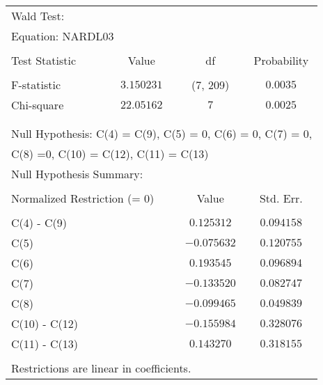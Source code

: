 \begin{tabular}{lrrr}
\multicolumn{1}{l}{Wald Test:}&\multicolumn{1}{c}{}&\multicolumn{1}{c}{}&\multicolumn{1}{c}{}\\
\multicolumn{2}{l}{Equation: NARDL03}&\multicolumn{1}{c}{}&\multicolumn{1}{c}{}\\
[4.5pt] \hline \\ [-4.5pt]
\multicolumn{1}{l}{Test Statistic}&\multicolumn{1}{c}{Value}&\multicolumn{1}{c}{df}&\multicolumn{1}{c}{Probability}\\
[4.5pt] \hline \\ [-4.5pt]
\multicolumn{1}{l}{F-statistic}&\multicolumn{1}{c}{$3.150231$}&\multicolumn{1}{c}{(7, 209)}&\multicolumn{1}{c}{$0.0035$}\\
\multicolumn{1}{l}{Chi-square}&\multicolumn{1}{c}{$22.05162$}&\multicolumn{1}{c}{$7$}&\multicolumn{1}{c}{$0.0025$}\\
[4.5pt] \hline \\ [-4.5pt]
\multicolumn{1}{c}{}&\multicolumn{1}{c}{}&\multicolumn{1}{c}{}&\multicolumn{1}{c}{}\\
\multicolumn{5}{l}{Null Hypothesis: C(4) = C(9), C(5) = 0, C(6) = 0, C(7) = 0,}\\
\multicolumn{3}{l}{C(8) =0, C(10) = C(12), C(11) = C(13)}&\multicolumn{1}{c}{}\\
\multicolumn{2}{l}{Null Hypothesis Summary:}&\multicolumn{1}{c}{}&\multicolumn{1}{c}{}\\
[4.5pt] \hline \\ [-4.5pt]
\multicolumn{2}{l}{Normalized Restriction (= 0)}&\multicolumn{1}{c}{Value}&\multicolumn{1}{c}{Std. Err.}\\
[4.5pt] \hline \\ [-4.5pt]
\multicolumn{1}{l}{C(4) - C(9)}&\multicolumn{1}{c}{}&\multicolumn{1}{c}{$0.125312$}&\multicolumn{1}{c}{$0.094158$}\\
\multicolumn{1}{l}{C(5)}&\multicolumn{1}{c}{}&\multicolumn{1}{c}{$-0.075632$}&\multicolumn{1}{c}{$0.120755$}\\
\multicolumn{1}{l}{C(6)}&\multicolumn{1}{c}{}&\multicolumn{1}{c}{$0.193545$}&\multicolumn{1}{c}{$0.096894$}\\
\multicolumn{1}{l}{C(7)}&\multicolumn{1}{c}{}&\multicolumn{1}{c}{$-0.133520$}&\multicolumn{1}{c}{$0.082747$}\\
\multicolumn{1}{l}{C(8)}&\multicolumn{1}{c}{}&\multicolumn{1}{c}{$-0.099465$}&\multicolumn{1}{c}{$0.049839$}\\
\multicolumn{1}{l}{C(10) - C(12)}&\multicolumn{1}{c}{}&\multicolumn{1}{c}{$-0.155984$}&\multicolumn{1}{c}{$0.328076$}\\
\multicolumn{1}{l}{C(11) - C(13)}&\multicolumn{1}{c}{}&\multicolumn{1}{c}{$0.143270$}&\multicolumn{1}{c}{$0.318155$}\\
[4.5pt] \hline \\ [-4.5pt]
\multicolumn{3}{l}{Restrictions are linear in coefficients.}&\multicolumn{1}{c}{}\\
\end{tabular}
